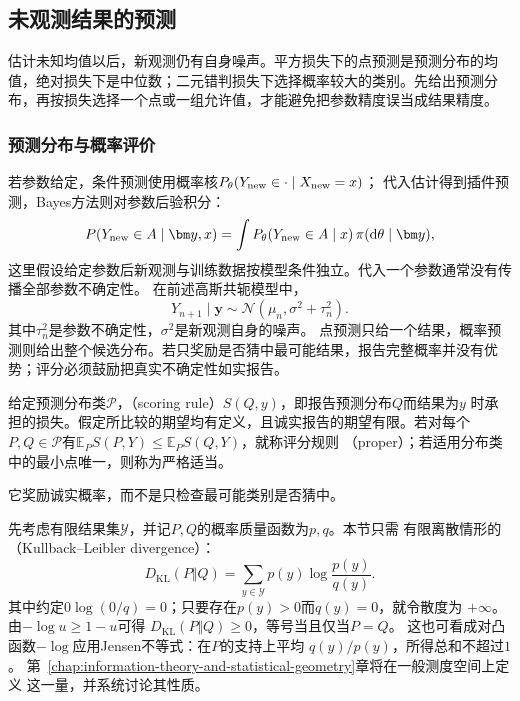 \subsection{未观测结果的预测}
\label{sec:stats-prediction-observation-limits}
估计未知均值以后，新观测仍有自身噪声。平方损失下的点预测是预测分布的均值，绝对损失下是中位数；二元错判损失下选择概率较大的类别。先给出预测分布，再按损失选择一个点或一组允许值，才能避免把参数精度误当成结果精度。

\subsubsection{预测分布与概率评价}
\label{sec:statistics-scoring-calibration}
若参数给定，条件预测使用概率核\(P_\theta(Y_{\rm new}\in\cdot\mid X_{\rm new}=x)\)；
代入估计得到插件预测，Bayes方法则对参数后验积分：
\[
P(Y_{\rm new}\in A\mid\bm y,x)
=\int P_\theta(Y_{\rm new}\in A\mid x)\,\pi(\mathrm d\theta\mid\bm y),
\]
这里假设给定参数后新观测与训练数据按模型条件独立。代入一个参数通常没有传播全部参数不确定性。
在前述高斯共轭模型中，
\[
  Y_{n+1}\mid\bm y
  \sim\mathcal N(\mu_n,\sigma^2+\tau_n^2).
\]
其中\(\tau_n^2\)是参数不确定性，\(\sigma^2\)是新观测自身的噪声。
点预测只给一个结果，概率预测则给出整个候选分布。若只奖励是否猜中最可能结果，报告完整概率并没有优势；评分必须鼓励把真实不确定性如实报告。
\begin{definition}[适当评分规则]
  \label{def:statistics-proper-scoring-rule}
  给定预测分布类\(\mathcal P\)，（scoring rule）\(S(Q,y)\)，即报告预测分布\(Q\)而结果为\(y\)
时承担的损失。假定所比较的期望均有定义，且诚实报告的期望有限。若对每个\(P,Q\in\mathcal P\)有\(\mathbb E_PS(P,Y)\leq\mathbb E_PS(Q,Y)\)，就称评分规则
（proper）；若适用分布类中的最小点唯一，则称为严格适当。
\end{definition}
它奖励诚实概率，而不是只检查最可能类别是否猜中。

先考虑有限结果集\(\mathcal Y\)，并记\(P,Q\)的概率质量函数为\(p,q\)。本节只需
有限离散情形的（Kullback--Leibler divergence）：
\[
  D_{\mathrm{KL}}(P\Vert Q)
  =
  \sum_{y\in\mathcal Y}p(y)\log\frac{p(y)}{q(y)}.
\]
其中约定\(0\log(0/q)=0\)；只要存在\(p(y)>0\)而\(q(y)=0\)，就令散度为
\(+\infty\)。由\(-\log u\geq1-u\)可得
\(D_{\mathrm{KL}}(P\Vert Q)\geq0\)，等号当且仅当\(P=Q\)。
这也可看成对凸函数\(-\log\)应用Jensen不等式：在\(P\)的支持上平均
\(q(y)/p(y)\)，所得总和不超过\(1\)。
第~\ref{chap:information-theory-and-statistical-geometry}章将在一般测度空间上定义
这一量，并系统讨论其性质。

